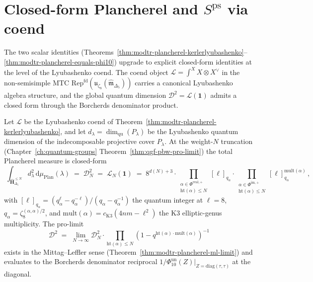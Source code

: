 \section{Closed-form Plancherel and \texorpdfstring{$S^{\mathrm{ps}}$}{S-ps} via coend}
\label{sec:modtr-closed-form-plancherel-sps}

The two scalar identities
(Theorems~\ref{thm:modtr-plancherel-kerlerlyubashenko}--\ref{thm:modtr-plancherel-equals-phi10})
upgrade to explicit closed-form identities at the level of the
Lyubashenko coend. The coend object
$\mathcal L = \int^X X \otimes X^\vee$ in the non-semisimple MTC
$\mathrm{Rep}^{\mathrm{fd}}(\mathfrak u_{\zeta_8}
(\widehat{\mathfrak m}_{\Delta_5}))$ carries a canonical
Lyubashenko algebra structure, and the global quantum dimension
$\mathcal D^2 = \mathcal L(\mathbf 1)$ admits a closed form through
the Borcherds denominator product.

\begin{theorem}
\label{thm:modtr-closed-form-plancherel}
Let $\mathcal L$ be the Lyubashenko coend of
Theorem~\ref{thm:modtr-plancherel-kerlerlyubashenko}, and let
$d_\lambda = \dim_{\mathrm{qu}}(P_\lambda)$ be the Lyubashenko
quantum dimension of the indecomposable projective cover $P_\lambda$.
At the weight-$N$ truncation (Chapter~\ref{ch:quantum-groups}
Theorem~\ref{thm:qgf-pbw-pro-limit}) the total Plancherel measure is
closed-form
\[
 \boxed{\;
 \int_{\widehat{\mathbf H}_{\Delta_5}^{\leq N}}\!\!\!
 d_\lambda^2\,\mathrm d\mu_{\mathrm{Plan}}(\lambda)
 \;=\;
 \mathcal D_N^2
 \;=\;
 \mathcal L_N(\mathbf 1)
 \;=\;
 8^{d(N)+3}\cdot\!\!\!
 \prod_{\substack{\alpha\in\Phi^{\mathrm{real}, +}\\
 \mathrm{ht}(\alpha)\leq N}}\!\!\!
 [\ell]_{q_\alpha}\cdot\!\!\!
 \prod_{\substack{\alpha\in\Phi^{\mathrm{im}, +}\\
 \mathrm{ht}(\alpha)\leq N}}\!\!\!
 [\ell]_{q_\alpha}^{\mathrm{mult}(\alpha)}\,,\;}
\]
with $[\ell]_{q_\alpha} = (q_\alpha^\ell - q_\alpha^{-\ell})/
(q_\alpha - q_\alpha^{-1})$ the quantum integer at $\ell = 8$,
$q_\alpha = \zeta_8^{(\alpha,\alpha)/2}$, and
$\mathrm{mult}(\alpha) = c_{\mathrm{K3}}(4nm - \ell^2)$ the
K$3$ elliptic-genus multiplicity. The pro-limit
\[
 \mathcal D^2
 \;=\;
 \lim_{N\to\infty}\mathcal D_N^2\cdot\prod_{\mathrm{ht}(\alpha)\leq N}
 (1 - q^{\mathrm{ht}(\alpha)\cdot\mathrm{mult}(\alpha)})^{-1}
\]
exists in the Mittag--Leffler sense
(Theorem~\ref{thm:modtr-plancherel-ml-limit}) and evaluates to the
Borcherds denominator reciprocal
$1/\Phi_{10}^{\mathrm{un}}(Z)|_{Z = \mathrm{diag}(\tau,\tau)}$ at the diagonal.
\end{theorem}

